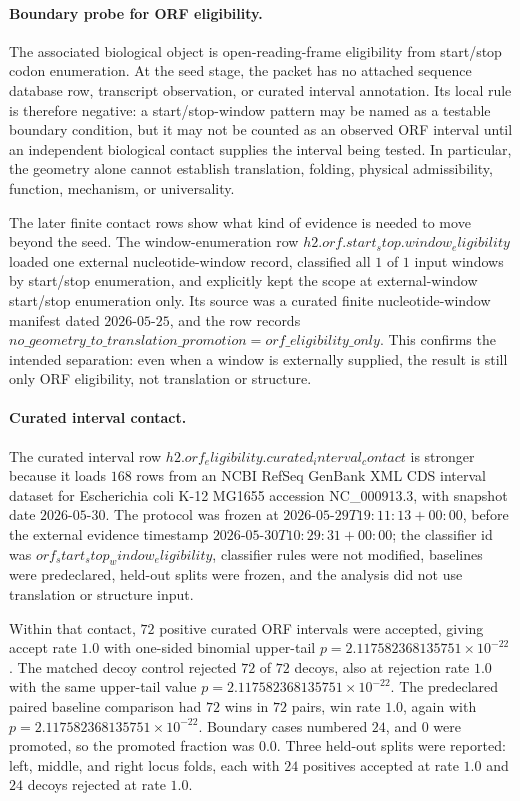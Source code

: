 \paragraph{Boundary probe for ORF eligibility.}
The associated biological object is open-reading-frame eligibility from start/stop codon enumeration. At the seed stage, the packet has no attached sequence database row, transcript observation, or curated interval annotation. Its local rule is therefore negative: a start/stop-window pattern may be named as a testable boundary condition, but it may not be counted as an observed ORF interval until an independent biological contact supplies the interval being tested. In particular, the geometry alone cannot establish translation, folding, physical admissibility, function, mechanism, or universality.

The later finite contact rows show what kind of evidence is needed to move beyond the seed. The window-enumeration row $h2.orf.start_stop.window_eligibility$ loaded one external nucleotide-window record, classified all $1$ of $1$ input windows by start/stop enumeration, and explicitly kept the scope at external-window start/stop enumeration only. Its source was a curated finite nucleotide-window manifest dated $2026$-$05$-$25$, and the row records $no\_geometry\_to\_translation\_promotion=orf\_eligibility\_only$. This confirms the intended separation: even when a window is externally supplied, the result is still only ORF eligibility, not translation or structure.

\paragraph{Curated interval contact.}
The curated interval row $h2.orf_eligibility.curated_interval_contact$ is stronger because it loads $168$ rows from an NCBI RefSeq GenBank XML CDS interval dataset for Escherichia coli K-12 MG1655 accession NC\_000913.3, with snapshot date $2026$-$05$-$30$. The protocol was frozen at $2026$-$05$-$29T19{:}11{:}13+00{:}00$, before the external evidence timestamp $2026$-$05$-$30T10{:}29{:}31+00{:}00$; the classifier id was $orf_start_stop_window_eligibility$, classifier rules were not modified, baselines were predeclared, held-out splits were frozen, and the analysis did not use translation or structure input.

Within that contact, $72$ positive curated ORF intervals were accepted, giving accept rate $1.0$ with one-sided binomial upper-tail $p=2.117582368135751\times 10^{-22}$. The matched decoy control rejected $72$ of $72$ decoys, also at rejection rate $1.0$ with the same upper-tail value $p=2.117582368135751\times 10^{-22}$. The predeclared paired baseline comparison had $72$ wins in $72$ pairs, win rate $1.0$, again with $p=2.117582368135751\times 10^{-22}$. Boundary cases numbered $24$, and $0$ were promoted, so the promoted fraction was $0.0$. Three held-out splits were reported: left, middle, and right locus folds, each with $24$ positives accepted at rate $1.0$ and $24$ decoys rejected at rate $1.0$.


